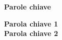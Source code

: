 
\clearemptydoublepage{}
\thispagestyle{empty}
\vspace*{20ex}
\begin{flushright}
    \begin{LARGE}
        \textbf{Parole chiave}\\
        \vspace{5ex}
    \end{LARGE}
    \begin{normalsize}
        \textbf{%
            Parola chiave 1\\%
            \medskip
            Parola chiave 2%
        }
    \end{normalsize}
\end{flushright}
\vfill
